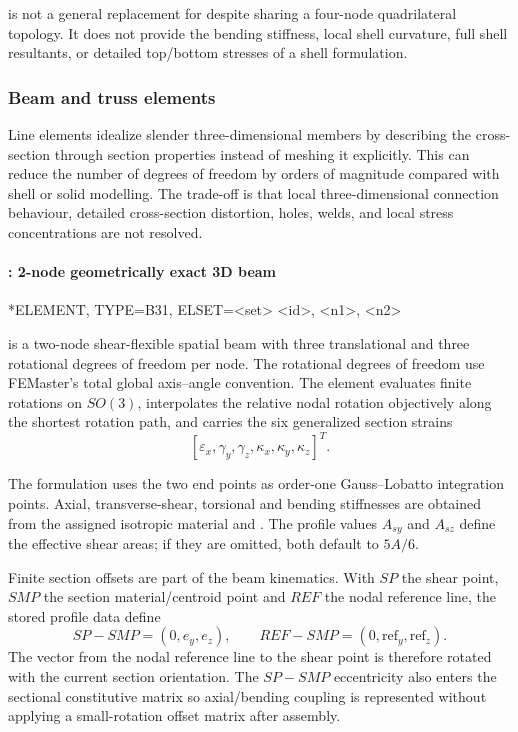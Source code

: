  is not a general replacement for  despite sharing a four-node quadrilateral topology. It does not provide the bending stiffness, local shell curvature, full shell resultants, or detailed top/bottom stresses of a shell formulation.

\clearpage
\subsubsection{Beam and truss elements}

Line elements idealize slender three-dimensional members by describing the cross-section through section properties instead of meshing it explicitly. This can reduce the number of degrees of freedom by orders of magnitude compared with shell or solid modelling. The trade-off is that local three-dimensional connection behaviour, detailed cross-section distortion, holes, welds, and local stress concentrations are not resolved.

\clearpage
\paragraph{: 2-node geometrically exact 3D beam}

\begin{syntax}
*ELEMENT, TYPE=B31, ELSET=<set>
<id>, <n1>, <n2>
\end{syntax}

 is a two-node shear-flexible spatial beam with three translational and three rotational degrees of freedom per node. The rotational degrees of freedom use FEMaster's total global axis--angle convention. The element evaluates finite rotations on \(SO(3)\), interpolates the relative nodal rotation objectively along the shortest rotation path, and carries the six generalized section strains
\[
[\varepsilon_x,\gamma_y,\gamma_z,\kappa_x,\kappa_y,\kappa_z]^T .
\]

The formulation uses the two end points as order-one Gauss--Lobatto integration points. Axial, transverse-shear, torsional and bending stiffnesses are obtained from the assigned isotropic material and . The profile values \(A_{sy}\) and \(A_{sz}\) define the effective shear areas; if they are omitted, both default to \(5A/6\).

Finite section offsets are part of the beam kinematics. With \(SP\) the shear point, \(SMP\) the section material/centroid point and \(REF\) the nodal reference line, the stored profile data define
\[
SP-SMP=(0,e_y,e_z),\qquad
REF-SMP=(0,\mathrm{ref}_y,\mathrm{ref}_z).
\]
The vector from the nodal reference line to the shear point is therefore rotated with the current section orientation. The \(SP-SMP\) eccentricity also enters the sectional constitutive matrix so axial/bending coupling is represented without applying a small-rotation offset matrix after assembly.

